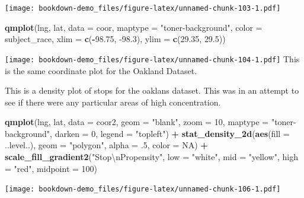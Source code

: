 \documentclass[
]{book}
\newenvironment{Shaded}{\begin{snugshade}}{\end{snugshade}}
\newcommand{\CharTok}[1]{\textcolor[rgb]{0.31,0.60,0.02}{#1}}
\newcommand{\DataTypeTok}[1]{\textcolor[rgb]{0.13,0.29,0.53}{#1}}
\newcommand{\DecValTok}[1]{\textcolor[rgb]{0.00,0.00,0.81}{#1}}
\newcommand{\FloatTok}[1]{\textcolor[rgb]{0.00,0.00,0.81}{#1}}
\newcommand{\KeywordTok}[1]{\textcolor[rgb]{0.13,0.29,0.53}{\textbf{#1}}}
\newcommand{\NormalTok}[1]{#1}
\newcommand{\OperatorTok}[1]{\textcolor[rgb]{0.81,0.36,0.00}{\textbf{#1}}}
\newcommand{\OtherTok}[1]{\textcolor[rgb]{0.56,0.35,0.01}{#1}}
\newcommand{\StringTok}[1]{\textcolor[rgb]{0.31,0.60,0.02}{#1}}
\begin{document}
\texttt{[image: bookdown-demo\_files/figure-latex/unnamed-chunk-103-1.pdf]}

\begin{Shaded}
\begin{Highlighting}[]
\KeywordTok{qmplot}\NormalTok{(lng, lat, }\DataTypeTok{data =}\NormalTok{ coor, }\DataTypeTok{maptype =} \StringTok{"toner-background"}\NormalTok{, }
       \DataTypeTok{color =}\NormalTok{ subject_race, }\DataTypeTok{xlim =} \KeywordTok{c}\NormalTok{(}\OperatorTok{-}\FloatTok{98.75}\NormalTok{, }\FloatTok{-98.3}\NormalTok{), }\DataTypeTok{ylim =} \KeywordTok{c}\NormalTok{(}\FloatTok{29.35}\NormalTok{, }\FloatTok{29.5}\NormalTok{))}
\end{Highlighting}
\end{Shaded}

\texttt{[image: bookdown-demo\_files/figure-latex/unnamed-chunk-104-1.pdf]}
This is the same coordinate plot for the Oakland Dataset.

This is a density plot of stops for the oaklans dataset. This was in an attempt to see if there were any particular areas of high concentration.

\begin{Shaded}
\begin{Highlighting}[]
\KeywordTok{qmplot}\NormalTok{(lng, lat, }\DataTypeTok{data =}\NormalTok{ coor2, }\DataTypeTok{geom =} \StringTok{"blank"}\NormalTok{, }
  \DataTypeTok{zoom =} \DecValTok{10}\NormalTok{, }\DataTypeTok{maptype =} \StringTok{"toner-background"}\NormalTok{, }\DataTypeTok{darken =} \DecValTok{0}\NormalTok{, }\DataTypeTok{legend =} \StringTok{"topleft"}\NormalTok{) }\OperatorTok{+}
\StringTok{  }\KeywordTok{stat_density_2d}\NormalTok{(}\KeywordTok{aes}\NormalTok{(}\DataTypeTok{fill =}\NormalTok{ ..level..), }\DataTypeTok{geom =} \StringTok{"polygon"}\NormalTok{, }\DataTypeTok{alpha =} \FloatTok{.5}\NormalTok{, }\DataTypeTok{color =} \OtherTok{NA}\NormalTok{) }\OperatorTok{+}
\StringTok{  }\KeywordTok{scale_fill_gradient2}\NormalTok{(}\StringTok{"Stop}\CharTok{\textbackslash{}n}\StringTok{Propensity"}\NormalTok{, }\DataTypeTok{low =} \StringTok{"white"}\NormalTok{, }\DataTypeTok{mid =} \StringTok{"yellow"}\NormalTok{, }\DataTypeTok{high =} \StringTok{"red"}\NormalTok{, }
                       \DataTypeTok{midpoint =} \DecValTok{100}\NormalTok{)}
\end{Highlighting}
\end{Shaded}

\texttt{[image: bookdown-demo\_files/figure-latex/unnamed-chunk-106-1.pdf]}
\end{document}
